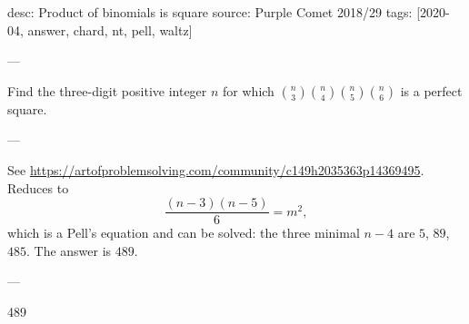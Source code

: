 desc: Product of binomials is square
source: Purple Comet 2018/29
tags: [2020-04, answer, chard, nt, pell, waltz]

---

Find the three-digit positive integer $n$ for which $\binom n3\binom n4\binom n5\binom n6$ is a perfect square.

---

See \url{https://artofproblemsolving.com/community/c149h2035363p14369495}.
Reduces to \[\frac{(n-3)(n-5)}6=m^2,\]
which is a Pell's equation and can be solved: the three minimal $n-4$ are $5$, $89$, $485$. The answer is $489$.

---

489
